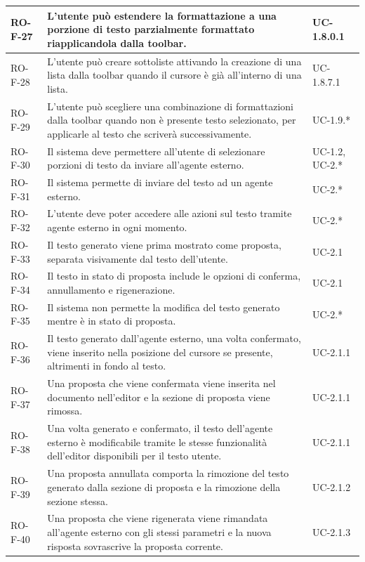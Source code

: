 \documentclass[11pt,a4paper]{article}
\begin{document}
\begin{longtable}{|p{}|>{\raggedright\arraybackslash}p{}|p{}|}
\hline
RO-F-27 & L'utente può estendere la formattazione a una porzione di testo parzialmente formattato riapplicandola dalla toolbar. & UC-1.8.0.1 \\
\hline
RO-F-28 & L'utente può creare sottoliste attivando la creazione di una lista dalla toolbar quando il cursore è già all'interno di una lista. & UC-1.8.7.1 \\
\hline
RO-F-29 & L'utente può scegliere una combinazione di formattazioni dalla toolbar quando non è presente testo selezionato, per applicarle al testo che scriverà successivamente. & UC-1.9.* \\
\hline
RO-F-30 & Il sistema deve permettere all'utente di selezionare porzioni di testo da inviare all'agente esterno. & UC-1.2, UC-2.* \\
\hline
RO-F-31 & Il sistema permette di inviare del testo ad un agente esterno. & UC-2.* \\
\hline
RO-F-32 & L'utente deve poter accedere alle azioni sul testo tramite agente esterno in ogni momento. & UC-2.* \\
\hline
RO-F-33 & Il testo generato viene prima mostrato come proposta, separata visivamente dal testo dell'utente. & UC-2.1 \\
\hline
RO-F-34 & Il testo in stato di proposta include le opzioni di conferma, annullamento e rigenerazione. & UC-2.1 \\
\hline
RO-F-35 & Il sistema non permette la modifica del testo generato mentre è in stato di proposta. & UC-2.* \\
\hline
RO-F-36 & Il testo generato dall'agente esterno, una volta confermato, viene inserito nella posizione del cursore se presente, altrimenti in fondo al testo. & UC-2.1.1 \\
\hline
RO-F-37 & Una proposta che viene confermata viene inserita nel documento nell'editor e la sezione di proposta viene rimossa. & UC-2.1.1 \\
\hline
RO-F-38 & Una volta generato e confermato, il testo dell'agente esterno è modificabile tramite le stesse funzionalità dell'editor disponibili per il testo utente. & UC-2.1.1 \\
\hline
RO-F-39 & Una proposta annullata comporta la rimozione del testo generato dalla sezione di proposta e la rimozione della sezione stessa. & UC-2.1.2 \\
\hline
RO-F-40 & Una proposta che viene rigenerata viene rimandata all'agente esterno con gli stessi parametri e la nuova risposta sovrascrive la proposta corrente. & UC-2.1.3 \\

\end{longtable}
\end{document}
